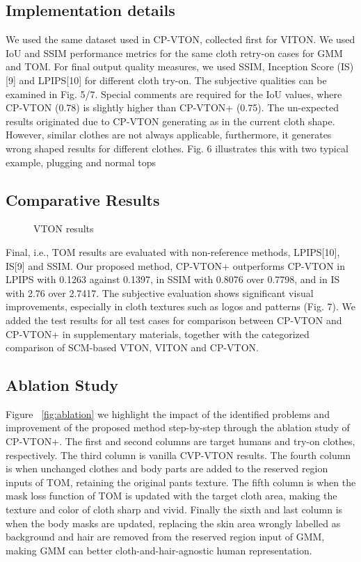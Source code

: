 \documentclass[runningheads]{llncs}
\begin{document}
\subsection{Implementation details} 

We used the same dataset used in CP-VTON, collected first for VITON. We used IoU and SSIM performance metrics for the same cloth retry-on cases for GMM and TOM. For final output quality measures, we used SSIM, Inception Score (IS)[9] and LPIPS[10] for different cloth try-on. The subjective qualities can be examined in Fig. 5/7.  Special comments are required for the IoU values, where CP-VTON (0.78) is slightly higher than CP-VTON+ (0.75). The un-expected results originated due to CP-VTON generating as in the current cloth shape. However, similar clothes are not always applicable, furthermore, it generates wrong shaped results for different clothes. Fig. 6 illustrates this with two typical example, plugging and normal tops

\subsection{Comparative Results}

\begin{figure}
\centering
\caption{VTON results}
\label{fig:vtonresults}
\end{figure}


Final, i.e., TOM results are evaluated with non-reference methods, LPIPS[10], IS[9] and SSIM. Our proposed method, CP-VTON+ outperforms CP-VTON in LPIPS with 0.1263 against 0.1397, in SSIM with 0.8076 over 0.7798, and in IS with 2.76 over 2.7417. The subjective evaluation shows significant visual improvements, especially in cloth textures such as logos and patterns (Fig. 7). We added the test results for all test cases for comparison between CP-VTON and CP-VTON+ in supplementary materials, together with the categorized comparison of SCM-based VTON, VITON and CP-VTON.


\subsection{Ablation Study}

Figure ~\ref{fig:ablation} we highlight the impact of the identified problems and improvement of the proposed method step-by-step through the ablation study of CP-VTON+. The first and second columns are target humans and try-on clothes, respectively. The third column is vanilla CVP-VTON results. The fourth column is when unchanged clothes and body parts are added to the reserved region inputs of TOM, retaining the original pants texture. The fifth column is when the mask loss function of TOM is updated with the target cloth area, making the texture and color of cloth sharp and vivid. Finally the sixth and last column is when the body masks are updated, replacing the skin area wrongly labelled as background and hair are removed from the reserved region input of GMM, making GMM can better cloth-and-hair-agnostic human representation.  
\end{document}
